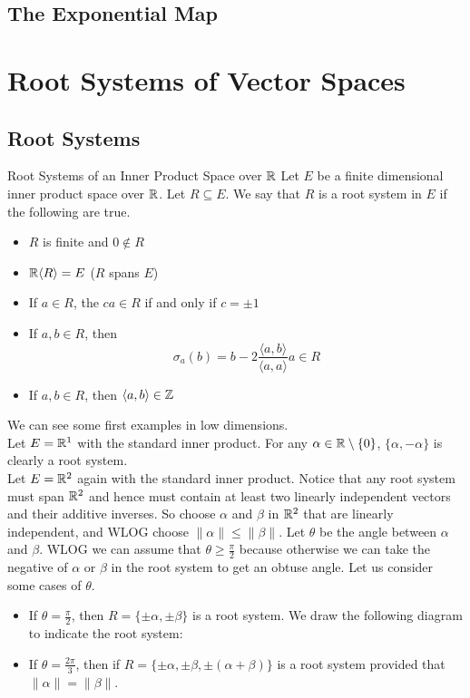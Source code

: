 \documentclass[a4paper]{article}
\begin{document}
\subsection{The Exponential Map}

\pagebreak
\section{Root Systems of Vector Spaces}
\subsection{Root Systems}
\begin{defn}{Root Systems of an Inner Product Space over $\mathbb{R}$}{} Let $E$ be a finite dimensional inner product space over $\mathbb{R}$. Let $R\subseteq E$. We say that $R$ is a root system in $E$ if the following are true. 
\begin{itemize}
\item $R$ is finite and $0\notin R$
\item $\mathbb{R}\langle R\rangle=E$ ($R$ spans $E$)
\item If $a\in R$, the $ca\in R$ if and only if $c=\pm1$
\item If $a,b\in R$, then $$\sigma_a(b)=b-2\frac{\langle a,b\rangle}{\langle a,a\rangle}a\in R$$
\item If $a,b\in R$, then $\langle a,b\rangle\in\mathbb{Z}$
\end{itemize}
\end{defn}

We can see some first examples in low dimensions. \\

Let $E=\mathbb{R}^1$ with the standard inner product. For any $\alpha\in\mathbb{R}\setminus\{0\}$, $\{\alpha,-\alpha\}$ is clearly a root system. \\

Let $E=\mathbb{R}^2$ again with the standard inner product. Notice that any root system must span $\mathbb{R}^2$ and hence must contain at least two linearly independent vectors and their additive inverses. So choose $\alpha$ and $\beta$ in $\mathbb{R}^2$ that are linearly independent, and WLOG choose $\|\alpha\|\leq\|\beta\|$. Let $\theta$ be the angle between $\alpha$ and $\beta$. WLOG we can assume that $\theta\geq\frac{\pi}{2}$ because otherwise we can take the negative of $\alpha$ or $\beta$ in the root system to get an obtuse angle. Let us consider some cases of $\theta$. 

\begin{itemize}
\item If $\theta=\frac{\pi}{2}$, then $R=\{\pm\alpha,\pm\beta\}$ is a root system. We draw the following diagram to indicate the root system: 
\item If $\theta=\frac{2\pi}{3}$, then if $R=\{\pm\alpha,\pm\beta,\pm(\alpha+\beta)\}$ is a root system provided that $\|\alpha\|=\|\beta\|$. 
\end{itemize}
\end{document}

